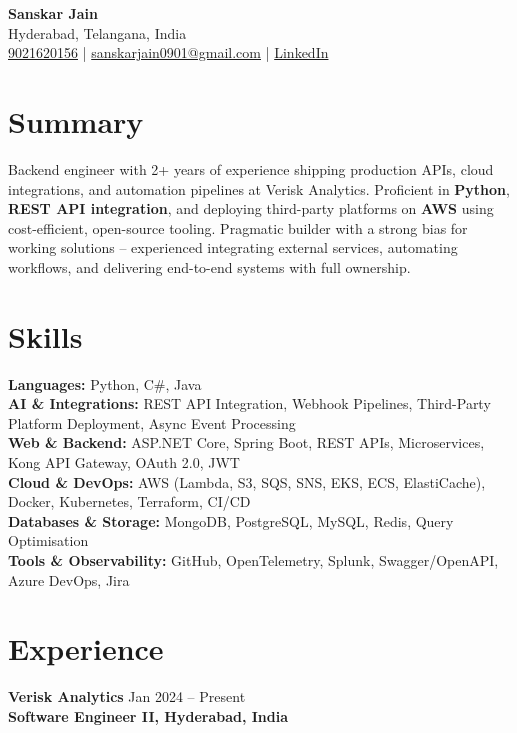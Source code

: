 \documentclass[letterpaper,10pt]{article}
\begin{document}
\begin{center}
    {\LARGE \textbf{Sanskar Jain}} \\
    Hyderabad, Telangana, India \\
    \href{tel:9021620156}{9021620156} \;|\;
    \href{mailto:sanskarjain0901@gmail.com}{sanskarjain0901@gmail.com} \;|\;
    \href{https://www.linkedin.com/in/sanskar-jain0901/}{LinkedIn}
\end{center}

\vspace{3pt}

\section*{Summary}
Backend engineer with 2+ years of experience shipping production APIs, cloud integrations, and automation pipelines at Verisk Analytics.
Proficient in \textbf{Python}, \textbf{REST API integration}, and deploying third-party platforms on \textbf{AWS} using cost-efficient, open-source tooling.
Pragmatic builder with a strong bias for working solutions -- experienced integrating external services, automating workflows, and delivering end-to-end systems with full ownership.

\section*{Skills}
\textbf{Languages:} Python, C\#, Java \\
\textbf{AI \& Integrations:} REST API Integration, Webhook Pipelines, Third-Party Platform Deployment, Async Event Processing \\
\textbf{Web \& Backend:} ASP.NET Core, Spring Boot, REST APIs, Microservices, Kong API Gateway, OAuth 2.0, JWT \\
\textbf{Cloud \& DevOps:} AWS (Lambda, S3, SQS, SNS, EKS, ECS, ElastiCache), Docker, Kubernetes, Terraform, CI/CD \\
\textbf{Databases \& Storage:} MongoDB, PostgreSQL, MySQL, Redis, Query Optimisation \\
\textbf{Tools \& Observability:} GitHub, OpenTelemetry, Splunk, Swagger/OpenAPI, Azure DevOps, Jira

\section*{Experience}

\textbf{Verisk Analytics} \hfill Jan 2024 -- Present \\
\textbf{Software Engineer II, Hyderabad, India}
\end{document}
